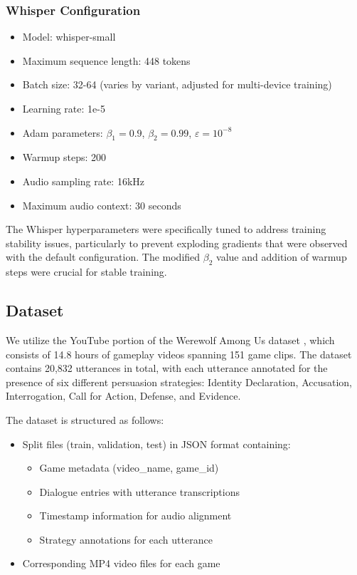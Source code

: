 \documentclass[10pt,twocolumn]{article}
\begin{document}
\subsubsection{Whisper Configuration}
\begin{itemize}
    \item Model: whisper-small
    \item Maximum sequence length: 448 tokens
    \item Batch size: 32-64 (varies by variant, adjusted for multi-device training)
    \item Learning rate: 1e-5
    \item Adam parameters: $\beta_1 = 0.9$, $\beta_2 = 0.99$, $\varepsilon = 10^{-8}$
    \item Warmup steps: 200
    \item Audio sampling rate: 16kHz
    \item Maximum audio context: 30 seconds
\end{itemize}

The Whisper hyperparameters were specifically tuned to address training stability issues, particularly to prevent exploding gradients that were observed with the default configuration. The modified $\beta_2$ value and addition of warmup steps were crucial for stable training.

\subsection{Dataset}
We utilize the YouTube portion of the Werewolf Among Us dataset \cite{bolinlai2023}, which consists of 14.8 hours of gameplay videos spanning 151 game clips. The dataset contains 20,832 utterances in total, with each utterance annotated for the presence of six different persuasion strategies: Identity Declaration, Accusation, Interrogation, Call for Action, Defense, and Evidence.

The dataset is structured as follows:
\begin{itemize}
    \item Split files (train, validation, test) in JSON format containing:
    \begin{itemize}
        \item Game metadata (video\_name, game\_id)
        \item Dialogue entries with utterance transcriptions
        \item Timestamp information for audio alignment
        \item Strategy annotations for each utterance
    \end{itemize}
    \item Corresponding MP4 video files for each game
\end{itemize}
\end{document}
